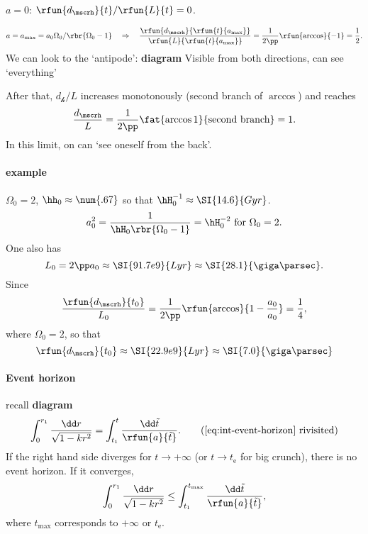 $a = 0$: $\rfun{d_\mscrh}{t}/\rfun{L}{t} = 0$.

\begin{equation}
a = a_\text{max} = a_0 \Omega_0/\rbr{\Omega_0 - 1} \quad\Rightarrow\quad
\frac{\rfun{d_\mscrh}{\rfun{t}{a_\text{max}}}}{\rfun{L}{\rfun{t}{a_\text{max}}}} 
= \frac{1}{2\pp} \rfun{\arccos}{-1} = \frac{1}{2}.
\end{equation}
We can look to the `antipode': \textbf{diagram}
Visible from both directions, can see `everything'

After that, $d_\mscrh/L$ increases monotonously (second branch of $\arccos$) 
and reaches
\begin{equation}
\frac{d_\mscrh}{L} = \frac{1}{2\pp}\fat{\arccos 1}{\text{second branch}} = 1.
\end{equation}
In this limit, on can `see oneself from the back'.

\paragraph{example} $\Omega_0 = 2$, $\hh_0 \approx \num{.67}$ so that 
$\hH_0^{-1} \approx \SI{14.6}{Gyr}$.
\begin{equation}
a_0^2 = \frac{1}{\hH_0\rbr{\Omega_0-1}} = \hH_0^{-2}\text{ for }\Omega_0 = 2.
\end{equation}
One also has
\begin{equation}
L_0 = 2\pp a_0 \approx \SI{91.7e9}{Lyr} \approx \SI{28.1}{\giga\parsec}.
\end{equation}
Since
\begin{equation}
\frac{\rfun{d_\mscrh}{t_0}}{L_0} = 
\frac{1}{2\pp}\rfun{\arccos}{1-\frac{a_0}{a_0}} = \frac{1}{4},
\end{equation}
where $\Omega_0 = 2$, so that
\begin{equation}
\rfun{d_\mscrh}{t_0} \approx \SI{22.9e9}{Lyr} \approx \SI{7.0}{\giga\parsec}
\end{equation}

\paragraph{Event horizon}
recall \textbf{diagram}
\begin{equation}
\int_0^{r_1} \frac{\dd r}{\sqrt{1-kr^2}} = \int_{t_1}^t \frac{\dd\tilde{t}}%
{\rfun{a}{\tilde{t}}}.
\tag{\ref{eq:int-event-horizon} rivisited}
\end{equation}
If the right hand side diverges for $t \to +\infty$ (or $t \to t_\text{e}$ for 
big crunch), there is no event horizon. If it converges,
\begin{equation}
\int_0^{r_1} \frac{\dd r}{\sqrt{1-kr^2}} \le \int_{t_1}^{t_\text{max}} 
\frac{\dd\tilde{t}}{\rfun{a}{\tilde{t}}},
\end{equation}
where $t_\text{max}$ corresponds to $+\infty$ or $t_\text{e}$.

